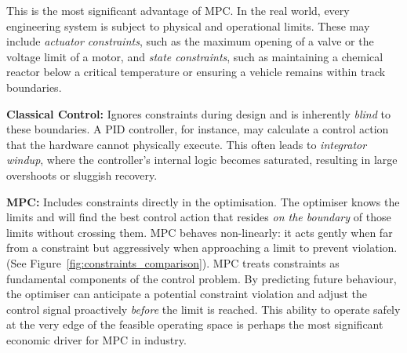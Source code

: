 This is the most significant advantage of MPC. In the real world, every engineering system is subject to physical and operational limits. These may include \textit{actuator constraints}, such as the maximum opening of a valve or the voltage limit of a motor, and \textit{state constraints}, such as maintaining a chemical reactor below a critical temperature or ensuring a vehicle remains within track boundaries.

\textbf{Classical Control:} Ignores constraints during design and is inherently \emph{blind} to these boundaries. A PID controller, for instance, may calculate a control action that the hardware cannot physically execute. This often leads to \emph{integrator windup}, where the controller's internal logic becomes saturated, resulting in large overshoots or sluggish recovery. 

\textbf{MPC:} Includes constraints directly in the optimisation. The optimiser knows the limits and will find the best control action that resides \textit{on the boundary} of those limits without crossing them. MPC behaves non-linearly: it acts gently when far from a constraint but aggressively when approaching a limit to prevent violation. (See Figure~\ref{fig:constraints_comparison}). MPC treats constraints as fundamental components of the control problem. By predicting future behaviour, the optimiser can anticipate a potential constraint violation and adjust the control signal proactively \emph{before} the limit is reached. This ability to operate safely at the very edge of the feasible operating space is perhaps the most significant economic driver for MPC in industry.


